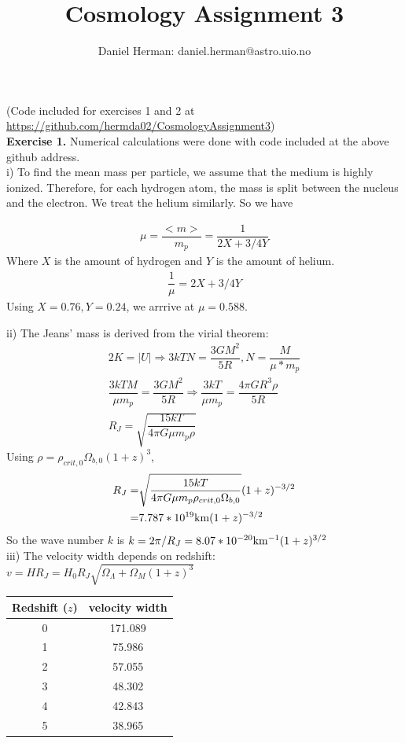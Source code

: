 \documentclass[a4paper]{article}
\title{Cosmology Assignment 3}
\author{Daniel Herman: daniel.herman@astro.uio.no}
\begin{document}
\begin{titlepage}
\maketitle
\end{titlepage}

(Code included for exercises 1 and 2 at \url{https://github.com/hermda02/CosmologyAssignment3})\\

\noindent \textbf{Exercise 1.}
Numerical calculations were done with code included at the above github address.\\
i) To find the mean mass per particle, we assume that the medium is highly ionized. Therefore, for each hydrogen atom, the mass is split between the nucleus and the electron. We treat the helium similarly. So we have

\begin{align*}
\mu = \dfrac{<m>}{m_p} = \dfrac{1}{2X+3/4Y}
\end{align*}
Where $X$ is the amount of hydrogen and $Y$ is the amount of helium.
\begin{align*}
\dfrac{1}{\mu} = 2X + 3/4Y
\end{align*}
Using $X = 0.76, Y = 0.24$, we arrrive at $\mu = 0.588$.

ii) The Jeans' mass is derived from the virial theorem:
\begin{align*}
2K = |U| \Rightarrow 3kTN = \dfrac{3GM^2}{5R}, N = \dfrac{M}{\mu*m_p}\\
\dfrac{3kTM}{\mu m_p} = \dfrac{3GM^2}{5R} \Rightarrow \dfrac{3kT}{\mu m_p} = \dfrac{4 \pi GR^3 \rho}{5R}\\
R_J = \sqrt{\dfrac{15kT}{4 \pi G \mu m_p \rho}}
\end{align*}
Using $\rho = \rho_{crit,0}\Omega_{b,0}(1+z)^3$,
\begin{align*}
R_J =& \sqrt{\dfrac{15kT}{4 \pi G \mu m_p \rho_{crit,0}\Omega_{b,0}}}(1+z)^{-3/2}\\
=& 7.787*10^{19} {\rm km} (1+z)^{-3/2}
\end{align*}
So the wave number $k$ is $k = 2\pi / R_J = 8.07*10^{-20}{\rm km^{-1}}(1+z)^{3/2}$\\
iii) The velocity width depends on redshift: $v = HR_J = H_0R_J\sqrt{\Omega_{\Lambda}+\Omega_M(1+z)^3} $\\

\begin{table}[h]
\centering
\begin{tabular}{c | c}
Redshift ($z$) & velocity width\\
\hline
\hline
0 & 171.089\\
1 & 75.986\\
2 & 57.055\\
3 & 48.302\\
4 & 42.843\\
5 & 38.965\\
\end{tabular}
\end{table}
\end{document}
